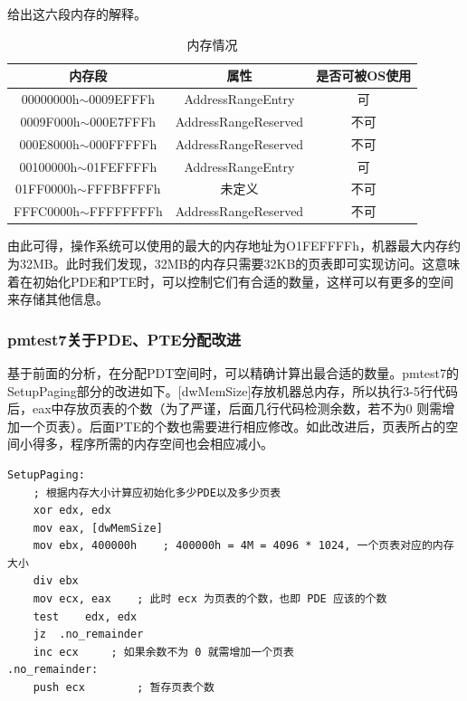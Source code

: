 \documentclass[UTF8,12pt]{ctexart}
\begin{document}
    给出这六段内存的解释。
\begin{table}[H]
\caption{内存情况}
\centering
\begin{tabular}{|c|c|c|}
\hline
{\color[HTML]{333333} \textbf{内存段}} & {\color[HTML]{333333} \textbf{属性}} & 是否可被OS使用 \\ \hline
00000000h$\sim$0009EFFFh            & AddressRangeEntry                  & 可        \\ \hline
0009F000h$\sim$000E7FFFh            & AddressRangeReserved               & 不可       \\ \hline
000E8000h$\sim$000FFFFFh            & AddressRangeReserved               & 不可        \\ \hline
00100000h$\sim$01FEFFFFh            & AddressRangeEntry                  & 可       \\ \hline
01FF0000h$\sim$FFFBFFFFh            & 未定义                                & 不可        \\ \hline
FFFC0000h$\sim$FFFFFFFFh            & AddressRangeReserved               & 不可       \\ \hline
\end{tabular}
\end{table}

    由此可得，操作系统可以使用的最大的内存地址为O1FEFFFFh，机器最大内存约为32MB。此时我们发现，32MB的内存只需要32KB的页表即可实现访问。这意味着在初始化PDE和PTE时，可以控制它们有合适的数量，这样可以有更多的空间来存储其他信息。
    
    \subsubsection{pmtest7关于PDE、PTE分配改进}
    基于前面的分析，在分配PDT空间时，可以精确计算出最合适的数量。pmtest7的SetupPaging部分的改进如下。[dwMemSize]存放机器总内存，所以执行3-5行代码后，eax中存放页表的个数（为了严谨，后面几行代码检测余数，若不为0 则需增加一个页表）。后面PTE的个数也需要进行相应修改。如此改进后，页表所占的空间小得多，程序所需的内存空间也会相应减小。
    \begin{lstlisting}[language={[x86masm]Assembler}]
SetupPaging:
	; 根据内存大小计算应初始化多少PDE以及多少页表
	xor	edx, edx
	mov	eax, [dwMemSize]
	mov	ebx, 400000h	; 400000h = 4M = 4096 * 1024, 一个页表对应的内存大小
	div	ebx
	mov	ecx, eax	; 此时 ecx 为页表的个数，也即 PDE 应该的个数
	test	edx, edx
	jz	.no_remainder
	inc	ecx		; 如果余数不为 0 就需增加一个页表
.no_remainder:
	push ecx		; 暂存页表个数
    \end{lstlisting}
    
\end{document}
